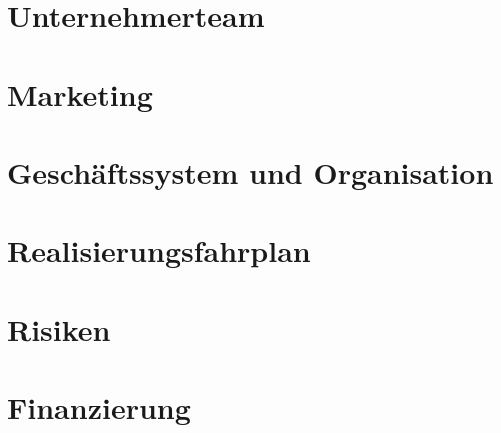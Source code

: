 \documentclass[11pt]{article}
\begin{document}
\section{Unternehmerteam}
\section{Marketing}
\section{Gesch\"aftssystem und Organisation}
\section{Realisierungsfahrplan}
\section{Risiken}
\section{Finanzierung}
\end{document}
